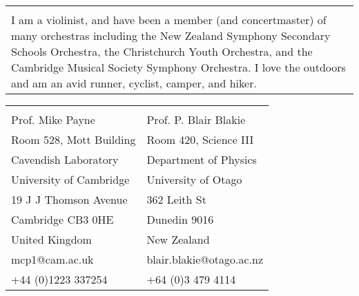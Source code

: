 \documentclass[10pt,a4paper,final]{article}
\begin{document}
\begin{table}[!h]
\sffamily
\begin{tabularx}{\textwidth}{X}
\rowcolor{seaborn_blue}
\multicolumn{1}{l}{\textcolor{white}{\textbf{Interests}}} \\
I am a violinist, and have been a member (and concertmaster) of many orchestras including the New Zealand Symphony Secondary Schools Orchestra, the Christchurch Youth Orchestra, and the Cambridge Musical Society Symphony Orchestra. I love the outdoors and am an avid runner, cyclist, camper, and hiker.
\end{tabularx}
\end{table}
%
\begin{table}[!h]
\sffamily
\begin{tabularx}{\textwidth}{X X}
\rowcolor{seaborn_blue}
\multicolumn{2}{l}{\textcolor{white}{\textbf{Referees}}} \\
Prof. Mike Payne                   & Prof. P. Blair Blakie \\
Room 528, Mott Building            & Room 420, Science III\\ 
Cavendish Laboratory               & Department of Physics \\
University of Cambridge            & University of Otago \\
19 J J Thomson Avenue              & 362 Leith St \\
Cambridge CB3 0HE                  & Dunedin 9016 \\
United Kingdom                     & New Zealand \\
mcp1@cam.ac.uk                     & blair.blakie@otago.ac.nz \\
+44 (0)1223 337254                 & +64 (0)3 479 4114\\
\end{tabularx}
\end{table}
\FloatBarrier
\end{document}
